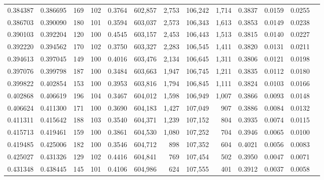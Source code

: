 \begin{tabular}{rrrrrrrrrrrrr}
0.384387 & 0.386695 &   169 & 102 &                                     0.3764 & 602,857 &   2,753 & 106,242 &   1,714 & 0.3837 & 0.0159 & 0.0255 \\
0.386703 & 0.390090 &   180 & 101 &                                     0.3594 & 603,037 &   2,573 & 106,343 &   1,613 & 0.3853 & 0.0149 & 0.0238 \\
0.390103 & 0.392204 &   120 & 100 &                                     0.4545 & 603,157 &   2,453 & 106,443 &   1,513 & 0.3815 & 0.0140 & 0.0227 \\
0.392220 & 0.394562 &   170 & 102 &                                     0.3750 & 603,327 &   2,283 & 106,545 &   1,411 & 0.3820 & 0.0131 & 0.0211 \\
0.394613 & 0.397045 &   149 & 100 &                                     0.4016 & 603,476 &   2,134 & 106,645 &   1,311 & 0.3806 & 0.0121 & 0.0198 \\
0.397076 & 0.399798 &   187 & 100 &                                     0.3484 & 603,663 &   1,947 & 106,745 &   1,211 & 0.3835 & 0.0112 & 0.0180 \\
0.399822 & 0.402854 &   153 & 100 &                                     0.3953 & 603,816 &   1,794 & 106,845 &   1,111 & 0.3824 & 0.0103 & 0.0166 \\
0.402868 & 0.406619 &   196 & 104 &                                     0.3467 & 604,012 &   1,598 & 106,949 &   1,007 & 0.3866 & 0.0093 & 0.0148 \\
0.406624 & 0.411300 &   171 & 100 &                                     0.3690 & 604,183 &   1,427 & 107,049 &     907 & 0.3886 & 0.0084 & 0.0132 \\
0.411311 & 0.415642 &   188 & 103 &                                     0.3540 & 604,371 &   1,239 & 107,152 &     804 & 0.3935 & 0.0074 & 0.0115 \\
0.415713 & 0.419461 &   159 & 100 &                                     0.3861 & 604,530 &   1,080 & 107,252 &     704 & 0.3946 & 0.0065 & 0.0100 \\
0.419485 & 0.425006 &   182 & 100 &                                     0.3546 & 604,712 &     898 & 107,352 &     604 & 0.4021 & 0.0056 & 0.0083 \\
0.425027 & 0.431326 &   129 & 102 &                                     0.4416 & 604,841 &     769 & 107,454 &     502 & 0.3950 & 0.0047 & 0.0071 \\
0.431348 & 0.438445 &   145 & 101 &                                     0.4106 & 604,986 &     624 & 107,555 &     401 & 0.3912 & 0.0037 & 0.0058 \\

\end{tabular}
